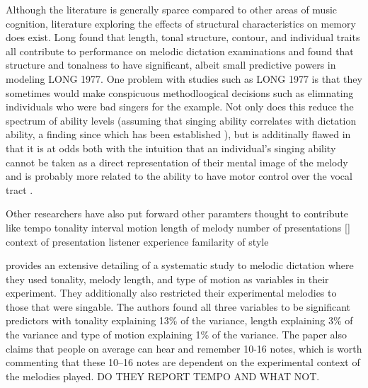 \documentclass[]{book}
\theoremstyle{definition}
\theoremstyle{definition}
\theoremstyle{definition}
\theoremstyle{remark}
\begin{document}
Although the literature is generally sparce compared to other areas of
music cognition, literature exploring the effects of structural
characteristics on memory does exist. Long found that length, tonal
structure, contour, and individual traits all contribute to performance
on melodic dictation examinations and found that structure and tonalness
to have significant, albeit small predictive powers in modeling LONG
1977. One problem with studies such as LONG 1977 is that they sometimes
would make conspicuous methodloogical decisions such as elimnating
individuals who were bad singers for the example. Not only does this
reduce the spectrum of ability levels (assuming that singing ability
correlates with dictation ability, a finding since which has been
established \citep{norrisRelationshipSightSinging2003}), but is
additinally flawed in that it is at odds both with the intuition that an
individual's singing ability cannot be taken as a direct representation
of their mental image of the melody and is probably more related to the
ability to have motor control over the vocal tract
\citep{pfordresherPoorPitchSingingAbsence2007}.

Other researchers have also put forward other paramters thought to
contribute like tempo
\citep{hofstetterComputerBaesedRecognitionPerceptual1981} tonality
\citep{dowlingScaleContourTwo1978}
\citep{longRelationshipsPitchMemory1977}
\citep{pembrookInterferenceTranscriptionProcess1986}
\citep{ouraMemoryMelodiesSubjects1988} interval motion
\citep{ortmannTonalDeterminantsMelodic1933, pembrookInterferenceTranscriptionProcess1986}
length of melody
\citep{longRelationshipsPitchMemory1977, pembrookInterferenceTranscriptionProcess1986}
number of presentations
\citep{hofstetterComputerBaesedRecognitionPerceptual1981}
{[}\citep{pembrookInterferenceTranscriptionProcess1986}{]} context of
presentation \citep{schellenbergEffectTonalRhythmicContext1985} listener
experience
\citep{longRelationshipsPitchMemory1977, ouraMemoryMelodiesSubjects1988}
\citep{schellenbergEffectTonalRhythmicContext1985, taylorStrategiesMemoryShort1983}
familarity of style \citep{schellenbergEffectTonalRhythmicContext1985}

\citep{pembrookInterferenceTranscriptionProcess1986} provides an
extensive detailing of a systematic study to melodic dictation where
they used tonality, melody length, and type of motion as variables in
their experiment. They additionally also restricted their experimental
melodies to those that were singable. The authors found all three
variables to be significant predictors with tonality explaining 13\% of
the variance, length explaining 3\% of the variance and type of motion
explaining 1\% of the variance. The paper also claims that people on
average can hear and remember 10-16 notes, which is worth commenting
that these 10--16 notes are dependent on the experimental context of the
melodies played. DO THEY REPORT TEMPO AND WHAT NOT.
\end{document}
